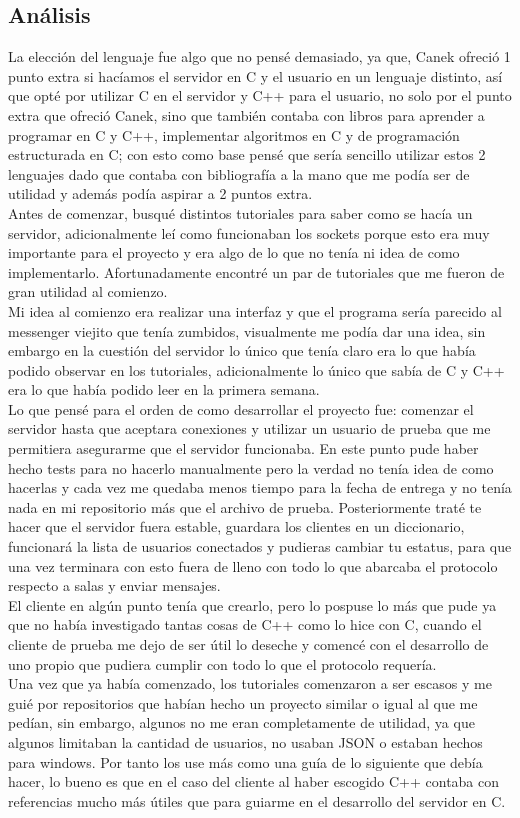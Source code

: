 \documentclass[12pt,a4paper]{article}
\begin{document}
\subsection{Análisis}
La elección del lenguaje fue algo que no pensé demasiado, ya que, Canek ofreció 1 punto extra si hacíamos el servidor en C y el usuario en 
un lenguaje distinto, así que opté por utilizar C en el servidor y C++ para el usuario, no solo por el punto extra que ofreció Canek, sino 
que también contaba con libros para aprender a programar en C y C++, implementar algoritmos en C y de programación estructurada en C; con 
esto como base pensé que sería sencillo utilizar estos 2 lenguajes dado que contaba con bibliografía a la mano que me podía ser de utilidad 
y además podía aspirar a 2 puntos extra.
\\
Antes de comenzar, busqué distintos tutoriales para saber como se hacía un servidor, adicionalmente leí como funcionaban los sockets porque 
esto era muy importante para el proyecto y era algo de lo que no tenía ni idea de como implementarlo. Afortunadamente encontré un par de 
tutoriales que me fueron de gran utilidad al comienzo.
\\
Mi idea al comienzo era realizar una interfaz y que el programa sería parecido al messenger viejito que tenía zumbidos, visualmente me 
podía dar una idea, sin embargo en la cuestión del servidor lo único que tenía claro era lo que había podido observar en los tutoriales, 
adicionalmente lo único que sabía de C y C++ era lo que había podido leer en la primera semana.
\\
Lo que pensé para el orden de como desarrollar el proyecto fue: comenzar el servidor hasta que aceptara conexiones y utilizar un usuario de 
prueba que me permitiera asegurarme que el servidor funcionaba. En este punto pude haber hecho tests para no hacerlo manualmente pero la 
verdad no tenía idea de como hacerlas y cada vez me quedaba menos tiempo para la fecha de entrega y no tenía nada en mi repositorio más que 
el archivo de prueba. Posteriormente traté te hacer que el servidor fuera estable, guardara los clientes en un diccionario, funcionará la 
lista de usuarios conectados y pudieras cambiar tu estatus, para que una vez terminara con esto fuera de lleno con todo lo que abarcaba el 
protocolo respecto a salas y enviar mensajes.\\
El cliente en algún punto tenía que crearlo, pero lo pospuse lo más que pude ya que no había investigado tantas cosas de C++ como lo hice 
con C, cuando el cliente de prueba me dejo de ser útil lo deseche y comencé con el desarrollo de uno propio que pudiera cumplir con todo 
lo que el protocolo requería.
\\
Una vez que ya había comenzado, los tutoriales comenzaron a ser escasos y me guié por repositorios que habían hecho un proyecto similar o 
igual al que me pedían, sin embargo, algunos no me eran completamente de utilidad, ya que algunos limitaban la cantidad de usuarios, no 
usaban JSON o estaban hechos para windows. Por tanto los use más como una guía de lo siguiente que debía hacer, lo bueno es que en el caso 
del cliente al haber escogido C++ contaba con referencias mucho más útiles que para guiarme en el desarrollo del servidor en C.
\end{document}
